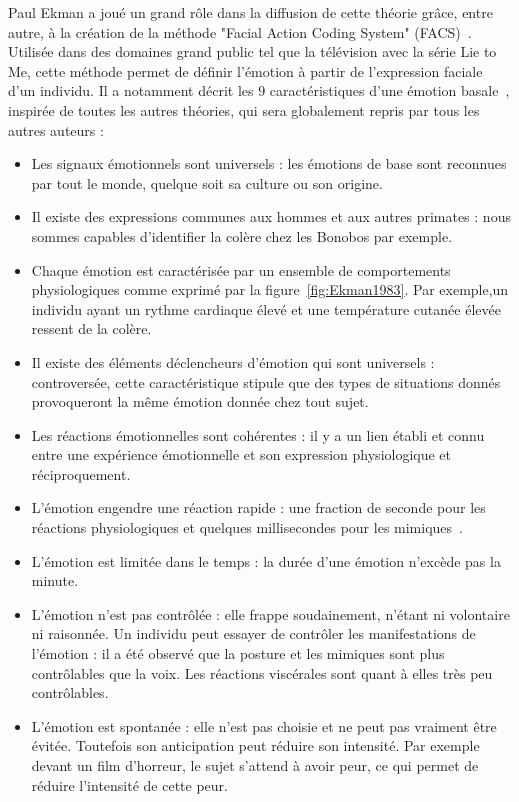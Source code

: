 Paul Ekman a joué un grand rôle dans la diffusion de cette théorie grâce, entre autre, à la création de la méthode "Facial Action Coding System" (FACS)~\cite{Ekman1978}. Utilisée dans des domaines grand public tel que la télévision avec la série Lie to Me, cette méthode permet de définir l'émotion à partir de l'expression faciale d'un individu. Il a notamment décrit les 9 caractéristiques d'une émotion basale~\cite{Ekman1992}, inspirée de toutes les autres théories, qui sera globalement repris par tous les autres auteurs :
\begin{itemize}
  \item Les signaux émotionnels sont universels : les émotions de base sont reconnues par tout le monde, quelque soit sa culture ou son origine.
  \item Il existe des expressions communes aux hommes et aux autres primates : nous sommes capables d'identifier la colère chez les Bonobos par exemple.
  \item Chaque émotion est caractérisée par un ensemble de comportements physiologiques comme exprimé par la figure~\ref{fig:Ekman1983}. Par exemple,un individu ayant un rythme cardiaque élevé et une température cutanée élevée ressent de la colère.
  
  \item Il existe des éléments déclencheurs d'émotion qui sont universels : controversée, cette caractéristique stipule que des types de situations donnés provoqueront la même émotion donnée chez tout sujet.
  \item Les réactions émotionnelles sont cohérentes : il y a un lien établi et connu entre une expérience émotionnelle et son expression physiologique et réciproquement.
  \item L'émotion engendre une réaction rapide : une fraction de seconde pour les réactions physiologiques et quelques millisecondes pour les mimiques~\cite{Ekman1978}.
  \item L'émotion est limitée dans le temps : la durée d'une émotion n'excède pas la minute.
  \item L'émotion n'est pas contrôlée : elle frappe soudainement, n'étant ni volontaire ni raisonnée. Un individu peut essayer de contrôler les manifestations de l'émotion : il a été observé que la posture et les mimiques sont plus contrôlables que la voix. Les réactions viscérales sont quant à elles très peu contrôlables.
  \item L'émotion est spontanée : elle n'est pas choisie et ne peut pas vraiment être évitée. Toutefois son anticipation peut réduire son intensité. Par exemple devant un film d'horreur, le sujet s'attend à avoir peur, ce qui permet de réduire l'intensité de cette peur.
\end{itemize}

